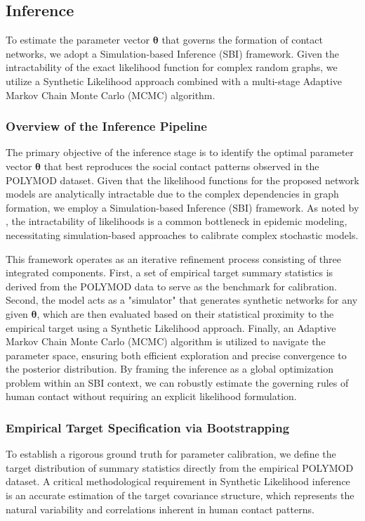 \subsection{Inference}
\label{sec:inference}

To estimate the parameter vector $\boldsymbol{\theta}$ that governs the formation of contact networks, we adopt a Simulation-based Inference (SBI) framework. Given the intractability of the exact likelihood function for complex random graphs, we utilize a Synthetic Likelihood approach combined with a multi-stage Adaptive Markov Chain Monte Carlo (MCMC) algorithm.

\subsubsection{Overview of the Inference Pipeline}
The primary objective of the inference stage is to identify the optimal parameter vector $\boldsymbol{\theta}$ that best reproduces the social contact patterns observed in the POLYMOD dataset.
Given that the likelihood functions for the proposed network models are analytically intractable due to the complex dependencies in graph formation, we employ a Simulation-based Inference (SBI) framework.
As noted by \textcite{mckinley2009inference}, the intractability of likelihoods is a common bottleneck in epidemic modeling, necessitating simulation-based approaches to calibrate complex stochastic models.

This framework operates as an iterative refinement process consisting of three integrated components.
First, a set of empirical target summary statistics is derived from the POLYMOD data to serve as the benchmark for calibration. Second, the model acts as a "simulator" that generates synthetic networks for any given $\boldsymbol{\theta}$, which are then evaluated based on their statistical proximity to the empirical target using a Synthetic Likelihood approach. Finally, an Adaptive Markov Chain Monte Carlo (MCMC) algorithm is utilized to navigate the parameter space, ensuring both efficient exploration and precise convergence to the posterior distribution. By framing the inference as a global optimization problem within an SBI context, we can robustly estimate the governing rules of human contact without requiring an explicit likelihood formulation.

\subsubsection{Empirical Target Specification via Bootstrapping}
To establish a rigorous ground truth for parameter calibration,
we define the target distribution of summary statistics directly from the empirical POLYMOD dataset.
A critical methodological requirement in Synthetic Likelihood inference is an accurate estimation of the target covariance structure,
which represents the natural variability and correlations inherent in human contact patterns. 

